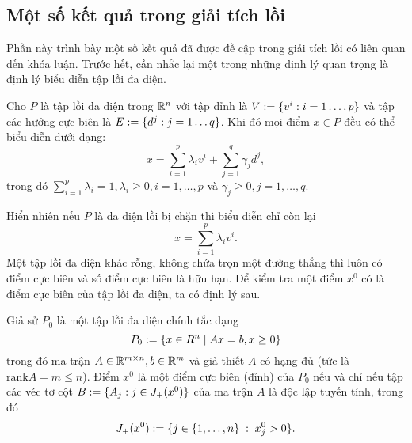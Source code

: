 \begin{flushleft}
\subsection{Một số kết quả trong giải tích lồi}
\end{flushleft}
Phần này trình bày một số kết quả đã được đề cập trong giải tích lồi có liên quan đến khóa luận. Trước hết, cần nhắc lại một trong những định lý quan trọng là định lý biểu diễn tập lồi đa diện.
\begin{theorem}\label{th.1.1.1} 
Cho $P$ là tập lồi đa diện trong ${\mathbb R}^n$ với tập đỉnh là $V:=\{v^i: i=1\dots,p\}$ và tập các hướng cực biên là $E:=\{d^j: j=1\dots q\}$. Khi đó mọi điểm $x\in P$ đều có thể biểu diễn dưới dạng:
\begin{equation}\label{eq.1.1.2.1}
x = \sum_{i=1}^p\lambda_iv^i + \sum_{j=1}^q\gamma_jd^j,
\end{equation}
trong đó $\sum_{i=1}^p\lambda_i = 1, \lambda_i\geq 0, i=1,\dots,p$ và $\gamma_j\geq 0, j=1,\dots, q$.
\end{theorem}
Hiển nhiên nếu $P$ là đa diện lồi bị chặn thì biểu diễn chỉ còn lại
$$
x = \sum_{i=1}^p \lambda_iv^i.
$$
Một tập lồi đa diện khác rỗng, không chứa trọn một đường thẳng thì luôn có điểm cực biên và số điểm cực biên là hữu hạn. Để kiểm tra một điểm $x^0$ có là điểm cực biên của tập lồi đa diện, ta có định lý sau.

\begin{theorem}\label{th.1.1.2}
Giả sử $P_0$ là một tập lồi đa diện chính tắc dạng
\begin{equation}\label{eq.1.1.2.2}
P_0 := \{x\in R^n\; |\; Ax = b, x\geq 0 \}
\end{equation}
trong đó ma trận $A\in{\mathbb R}^{m\times n}, b\in{\mathbb R}^m$ và giả thiết $A$ có hạng đủ (tức là $\text{rank}A = m\leq n$). Điểm $x^0$ là một điểm cực biên (đỉnh) của $P_0$ nếu và chỉ nếu tập các véc tơ cột $B:=\{A_j: j\in J_+(x^0)\}$ của ma trận $A$ là độc lập tuyến tính, trong đó
\begin{equation}\label{eq.1.1.2.3}
J_+(x^0):=\{j\in\{1,\dots, n\}\;:\; x^0_j>0\}.
\end{equation}
\end{theorem}

